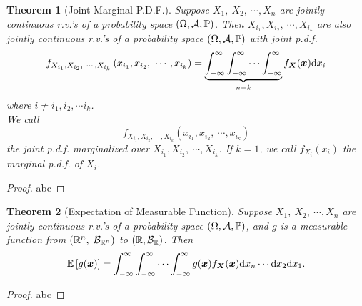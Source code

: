 \documentclass[openany,12pt]{book}
\newtheorem{theorem}{Theorem}[chapter]
\begin{document}
\begin{theorem}[Joint Marginal P.D.F.]
Suppose $X_1,\ X_2,\ \cdots,X_n$ are jointly continuous r.v.'s of a probability space $(\Omega,\mathcal{A},\mathbb{P})$. Then $X_{i_1},X_{i_2},\ \cdots,X_{i_k}$ are also jointly continuous r.v.'s of a probability space $(\Omega,\mathcal{A},\mathbb{P})$ with joint p.d.f.
$$
f_{X_{i_1},X_{i_2},\ \cdots,X_{i_k}}\left(x_{i_1},x_{i_2},\ \cdots,x_{i_k}\right)=\underbrace{\int_{-\infty}^{\infty}\int_{-\infty}^{\infty}\cdots\int_{-\infty}^{\infty}}_{n-k}{f_{\mX}(\mx)\dif x_i}
$$
where $i\neq i_1,i_2,\cdots i_k$.\\
We call $$f_{X_{i_1},X_{i_2},\ \cdots,X_{i_k}}\left(x_{i_1},x_{i_2},\ \cdots,x_{i_k}\right)$$ the joint p.d.f. marginalized over $X_{i_1},X_{i_2},\ \cdots,X_{i_k}$. If $k=1$, we call $f_{X_i}(x_i)$ the marginal p.d.f. of $X_i$.
\end{theorem}

\begin{proof}
  abc
\end{proof}

\begin{theorem}[Expectation of Measurable Function]
Suppose $X_1,\ X_2,\ \cdots,X_n$ are jointly continuous r.v.'s of a probability space $(\Omega,\mathcal{A},\mathbb{P})$, and $g$ is a measurable function from $(\mathbb{R}^n,\ \mb_{\mathbb{R}^n})$ to $(\mathbb{R},\mathcal{B}_\mathbb{R})$. Then
$$
\mathbb{E}\left[g(\bm{x})\right]=\int_{-\infty}^{\infty}\int_{-\infty}^{\infty}{\cdots\int_{-\infty}^{\infty}{g(\bm{x})f_{\bm{X}}(\bm{x})\mathrm{d} x_n\cdots \mathrm{d} x_2\mathrm{d} x_1}}.
$$
\end{theorem}

\begin{proof}
  abc
\end{proof}
\end{document}
